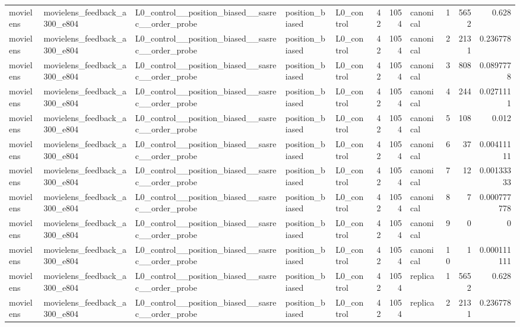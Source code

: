 \begin{table}[htbp!]
\begin{tabular}{lllllrrlrrr}
movielens & movielens\_feedback\_a300\_e804 & L0\_control\_\_position\_biased\_\_sasrec\_\_order\_probe & position\_biased & L0\_control & 42 & 1054 & canonical & 1 & 5652 & 0.628 \\
movielens & movielens\_feedback\_a300\_e804 & L0\_control\_\_position\_biased\_\_sasrec\_\_order\_probe & position\_biased & L0\_control & 42 & 1054 & canonical & 2 & 2131 & 0.236778 \\
movielens & movielens\_feedback\_a300\_e804 & L0\_control\_\_position\_biased\_\_sasrec\_\_order\_probe & position\_biased & L0\_control & 42 & 1054 & canonical & 3 & 808 & 0.0897778 \\
movielens & movielens\_feedback\_a300\_e804 & L0\_control\_\_position\_biased\_\_sasrec\_\_order\_probe & position\_biased & L0\_control & 42 & 1054 & canonical & 4 & 244 & 0.0271111 \\
movielens & movielens\_feedback\_a300\_e804 & L0\_control\_\_position\_biased\_\_sasrec\_\_order\_probe & position\_biased & L0\_control & 42 & 1054 & canonical & 5 & 108 & 0.012 \\
movielens & movielens\_feedback\_a300\_e804 & L0\_control\_\_position\_biased\_\_sasrec\_\_order\_probe & position\_biased & L0\_control & 42 & 1054 & canonical & 6 & 37 & 0.00411111 \\
movielens & movielens\_feedback\_a300\_e804 & L0\_control\_\_position\_biased\_\_sasrec\_\_order\_probe & position\_biased & L0\_control & 42 & 1054 & canonical & 7 & 12 & 0.00133333 \\
movielens & movielens\_feedback\_a300\_e804 & L0\_control\_\_position\_biased\_\_sasrec\_\_order\_probe & position\_biased & L0\_control & 42 & 1054 & canonical & 8 & 7 & 0.000777778 \\
movielens & movielens\_feedback\_a300\_e804 & L0\_control\_\_position\_biased\_\_sasrec\_\_order\_probe & position\_biased & L0\_control & 42 & 1054 & canonical & 9 & 0 & 0 \\
movielens & movielens\_feedback\_a300\_e804 & L0\_control\_\_position\_biased\_\_sasrec\_\_order\_probe & position\_biased & L0\_control & 42 & 1054 & canonical & 10 & 1 & 0.000111111 \\
movielens & movielens\_feedback\_a300\_e804 & L0\_control\_\_position\_biased\_\_sasrec\_\_order\_probe & position\_biased & L0\_control & 42 & 1054 & replica & 1 & 5652 & 0.628 \\
movielens & movielens\_feedback\_a300\_e804 & L0\_control\_\_position\_biased\_\_sasrec\_\_order\_probe & position\_biased & L0\_control & 42 & 1054 & replica & 2 & 2131 & 0.236778 \\

\end{tabular}
\end{table}
